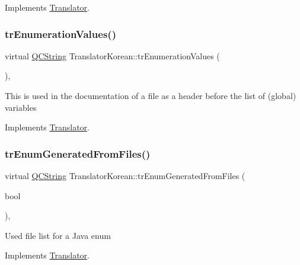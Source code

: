 Implements \mbox{\hyperlink{class_translator}{Translator}}.

\mbox{\label{class_translator_korean_a56da3ae55f29b186d10a2175894828c6}} 
\subsubsection{\texorpdfstring{trEnumerationValues()}{trEnumerationValues()}}
{\footnotesize\ttfamily virtual \mbox{\hyperlink{class_q_c_string}{Q\+C\+String}} Translator\+Korean\+::tr\+Enumeration\+Values (\begin{DoxyParamCaption}{ }\end{DoxyParamCaption})\hspace{0.3cm}{\ttfamily [inline]}, {\ttfamily [virtual]}}

This is used in the documentation of a file as a header before the list of (global) variables 

Implements \mbox{\hyperlink{class_translator}{Translator}}.

\mbox{\label{class_translator_korean_a601868bc904ff732ec99ec5886066faa}} 
\subsubsection{\texorpdfstring{trEnumGeneratedFromFiles()}{trEnumGeneratedFromFiles()}}
{\footnotesize\ttfamily virtual \mbox{\hyperlink{class_q_c_string}{Q\+C\+String}} Translator\+Korean\+::tr\+Enum\+Generated\+From\+Files (\begin{DoxyParamCaption}\item[{bool}]{ }\end{DoxyParamCaption})\hspace{0.3cm}{\ttfamily [inline]}, {\ttfamily [virtual]}}

Used file list for a Java enum 

Implements \mbox{\hyperlink{class_translator}{Translator}}.

\mbox{\label{class_translator_korean_a21a2924f7a9c319d9c987c0c17aad7f0}} 
